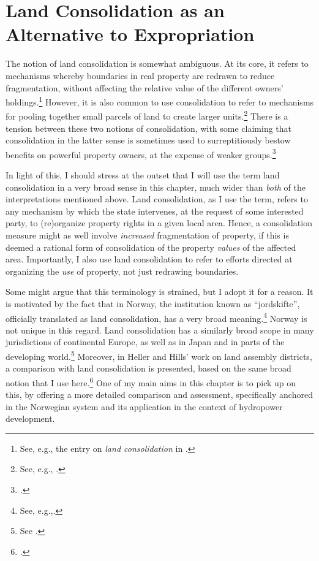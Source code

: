 
\section{Land Consolidation as an Alternative to Expropriation}\label{sec:lce}

The notion of land consolidation is somewhat ambiguous. At its core, it refers to  mechanisms whereby boundaries in real property are redrawn to reduce fragmentation, without affecting the relative value of the different owners' holdings.\footnote{See, e.g., the entry on {\it land consolidation} in \cite{mayhew09}.} However, it is also common to use consolidation to refer to mechanisms for pooling together small parcels of land to create larger units.\footnote{See, e.g., \cite{lerman06}.} There is a tension between these two notions of consolidation, with some claiming that consolidation in the latter sense is sometimes used to surreptitiously bestow benefits on powerful property owners, at the expense of weaker groups.\footcite[237-239]{lipton09}

In light of this, I should stress at the outset that I will use the term land consolidation in a very broad sense in this chapter, much wider than {\it both} of the interpretations mentioned above. Land consolidation, as I use the term, refers to any mechanism by which the state intervenes, at the request of some interested party, to (re)organize property rights in a given local area. Hence, a consolidation measure might as well involve {\it increased} fragmentation of property, if this is deemed a rational form of consolidation of the property {\it values} of the affected area. Importantly, I also use land consolidation to refer to efforts directed at organizing the {\it use} of property, not just redrawing boundaries.

Some might argue that this terminology is strained, but I adopt it for a reason. It is motivated by the fact that in Norway, the institution known as ``jordskifte'', officially translated as land consolidation, has a very broad meaning.\footnote{See, e.g.,\cite{reiten09,rognes03}.} Norway is not unique in this regard. Land consolidation has a similarly broad scope in many jurisdictions of continental Europe, as well as in Japan and in parts of the developing world.\footnote{See \cite{sky07,vitikainen04}.} Moreover, in Heller and Hills' work on land assembly districts, a comparison with land consolidation is presented, based on the same broad notion that I use here.\footcite{heller08} One of my main aims in this chapter is to pick up on this, by offering a more detailed comparison and assessment, specifically anchored in the Norwegian system and its application in the context of hydropower development.

